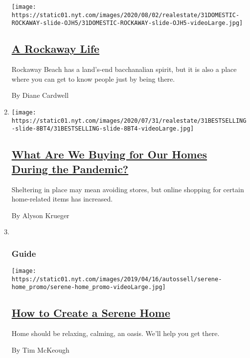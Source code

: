 \begin{enumerate}
  \texttt{[image: https://static01.nyt.com/images/2020/08/02/realestate/31DOMESTIC-ROCKAWAY-slide-OJH5/31DOMESTIC-ROCKAWAY-slide-OJH5-videoLarge.jpg]}

  \hypertarget{a-rockaway-life}{%
  \subsection{\texorpdfstring{\href{/2020/07/31/realestate/a-rockaway-beach-queens-life.html}{A
  Rockaway Life}}{A Rockaway Life}}\label{a-rockaway-life}}

  Rockaway Beach has a land's-end bacchanalian spirit, but it is also a
  place where you can get to know people just by being there.

  By Diane Cardwell
\item
  \texttt{[image: https://static01.nyt.com/images/2020/07/31/realestate/31BESTSELLING-slide-8BT4/31BESTSELLING-slide-8BT4-videoLarge.jpg]}

  \hypertarget{what-are-we-buying-for-our-homes-during-the-pandemic}{%
  \subsection{\texorpdfstring{\href{/2020/07/31/realestate/pandemic-shopping-home-design.html}{What
  Are We Buying for Our Homes During the
  Pandemic?}}{What Are We Buying for Our Homes During the Pandemic?}}\label{what-are-we-buying-for-our-homes-during-the-pandemic}}

  Sheltering in place may mean avoiding stores, but online shopping for
  certain home-related items has increased.

  By Alyson Krueger
\item ~
  \hypertarget{guide}{%
  \subsubsection{Guide}\label{guide}}

  \texttt{[image: https://static01.nyt.com/images/2019/04/16/autossell/serene-home\_promo/serene-home\_promo-videoLarge.jpg]}

  \hypertarget{how-to-create-a-serene-home}{%
  \subsection{\texorpdfstring{\href{/interactive/2019/05/15/smarter-living/serene-home.html}{How
  to Create a Serene
  Home}}{How to Create a Serene Home}}\label{how-to-create-a-serene-home}}

  Home should be relaxing, calming, an oasis. We'll help you get there.

  By Tim McKeough
\end{enumerate}

